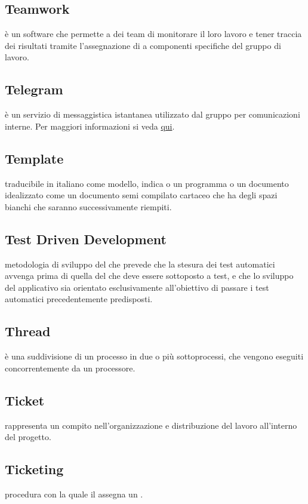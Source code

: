 \documentclass[12pt,a4paper]{article}
\begin{document}
\subsection{Teamwork} 
è un software che permette a dei team di monitorare il loro lavoro e tener traccia dei risultati tramite l'assegnazione di  a componenti specifiche del gruppo di lavoro.

\subsection{Telegram} 
è un servizio di messaggistica istantanea utilizzato dal gruppo per comunicazioni interne. Per maggiori informazioni si veda \href{https://it.wikipedia.org/wiki/Telegram_(software)}{qui}.

\subsection{Template} 
traducibile in italiano come modello, indica o un programma o un documento idealizzato come un documento semi compilato cartaceo che ha degli spazi bianchi che saranno successivamente riempiti.


\subsection{Test Driven Development} 
 metodologia di sviluppo del  che prevede che la stesura dei test automatici avvenga prima di quella del  che deve essere sottoposto a  test, e che lo sviluppo del  applicativo sia orientato esclusivamente all'obiettivo di passare i test automatici precedentemente predisposti.

\subsection{Thread} 
è una suddivisione di un processo in due o più sottoprocessi, che vengono eseguiti concorrentemente da un processore.

\subsection{Ticket} 
rappresenta un compito nell'organizzazione e distribuzione del lavoro all'interno del progetto.

\subsection{Ticketing} 
procedura con la quale il \RE assegna un .
\end{document}
